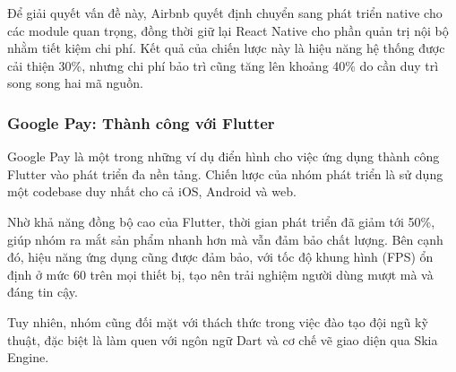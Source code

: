 Để giải quyết vấn đề này, Airbnb quyết định chuyển sang phát triển native cho các module quan trọng,  
đồng thời giữ lại React Native cho phần quản trị nội bộ nhằm tiết kiệm chi phí. Kết quả của chiến lược này là hiệu năng hệ thống được cải thiện 30\%,  
nhưng chi phí bảo trì cũng tăng lên khoảng 40\% do cần duy trì song song hai mã nguồn.

\vspace{0.5cm}

\subsubsection{Google Pay: Thành công với Flutter}

\hspace*{1.5em}Google Pay là một trong những ví dụ điển hình cho việc ứng dụng thành công Flutter vào phát triển đa nền tảng.  
Chiến lược của nhóm phát triển là sử dụng một codebase duy nhất cho cả iOS, Android và web.

Nhờ khả năng đồng bộ cao của Flutter, thời gian phát triển đã giảm tới 50\%,  
giúp nhóm ra mắt sản phẩm nhanh hơn mà vẫn đảm bảo chất lượng. Bên cạnh đó, hiệu năng ứng dụng cũng được đảm bảo, với tốc độ khung hình (FPS) ổn định ở mức 60 trên mọi thiết bị,  
tạo nên trải nghiệm người dùng mượt mà và đáng tin cậy.

Tuy nhiên, nhóm cũng đối mặt với thách thức trong việc đào tạo đội ngũ kỹ thuật,  
đặc biệt là làm quen với ngôn ngữ Dart và cơ chế vẽ giao diện qua Skia Engine.

